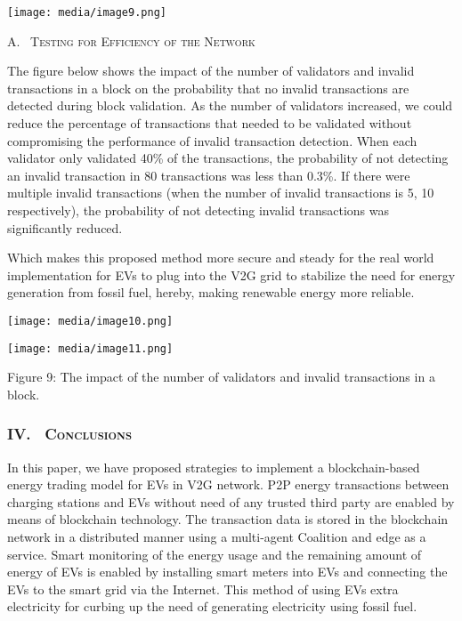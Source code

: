 \documentclass[
]{article}
\begin{document}
\texttt{[image: media/image9.png]}

A.~ \textsc{Testing for Efficiency of the Network}

The figure below shows the impact of the number of validators and
invalid transactions in a block on the probability that no invalid
transactions are detected during block validation. As the number of
validators increased, we could reduce the percentage of transactions
that needed to be validated without compromising the performance of
invalid transaction detection. When each validator only validated 40\%
of the transactions, the probability of not detecting an invalid
transaction in 80 transactions was less than 0.3\%. If there were
multiple invalid transactions (when the number of invalid transactions
is 5, 10 respectively), the probability of not detecting invalid
transactions was significantly reduced.

Which makes this proposed method more secure and steady for the real
world implementation for EVs to plug into the V2G grid to stabilize the
need for energy generation from fossil fuel, hereby, making renewable
energy more reliable.

\texttt{[image: media/image10.png]}

\texttt{[image: media/image11.png]}

Figure 9: The impact of the number of validators and invalid
transactions in a block.

\hypertarget{iv.-conclusions}{%
\subsubsection{\texorpdfstring{IV.~
\textsc{Conclusions}}{IV.~ Conclusions}}\label{iv.-conclusions}}

In this paper, we have proposed strategies to implement a
blockchain-based energy trading model for EVs in V2G network. P2P energy
transactions between charging stations and EVs without need of any
trusted third party are enabled by means of blockchain technology. The
transaction data is stored in the blockchain network in a distributed
manner using a multi-agent Coalition and edge as a service. Smart
monitoring of the energy usage and the remaining amount of energy of EVs
is enabled by installing smart meters into EVs and connecting the EVs to
the smart grid via the Internet. This method of using EVs extra
electricity for curbing up the need of generating electricity using
fossil fuel.
\end{document}
